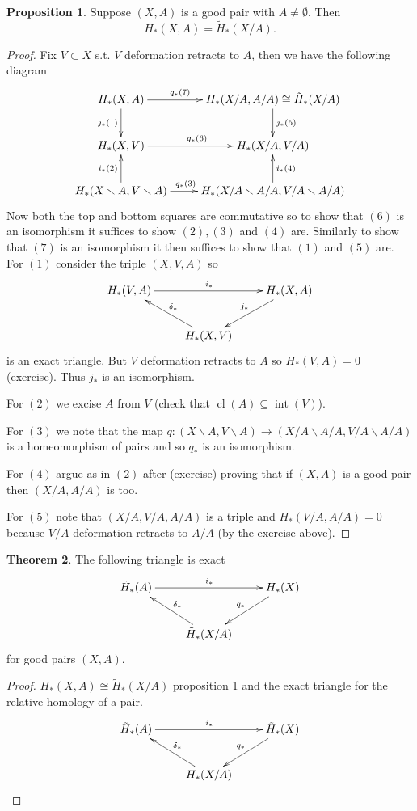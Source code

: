 \documentclass[12pt]{article}
\theoremstyle{definition}
\newtheorem{thm}{Theorem}[subsection]
\newtheorem{prop}[thm]{Proposition}
\theoremstyle{definition}
\renewcommand{\H}{H_*}
\begin{document}
\begin{prop}\label{pairiso}%
Suppose $(X,A)$ is a good pair with $A \ne \emptyset$.
Then 
\[
\H(X,A) = \tilde\H(X/A).
\]
\end{prop}
\begin{proof}
Fix $V \subset X$ s.t. $V$ deformation retracts to $A$, then we have the following diagram
\[
\xymatrix
{
\H(X,A)\ar[d]_{j_* (1)} \ar[r]^{q_* (7) \quad\qquad} & \H(X/A,A/A) \cong \tilde\H(X/A)\ar[d]^{j_* (5)}\\
\H(X,V) \ar[r]^{q_* (6)}  & \H(X/A,V/A)\\
\H(X\smallsetminus A,V\smallsetminus A)\ar[u]^{i_* (2)} \ar[r]^{q_* (3)\qquad}& \H(X/A\smallsetminus A/A,V/A\smallsetminus A/A)\ar[u]_{i_* (4)}
}
\]
Now both the top and bottom squares are commutative so to show that $(6)$ is an isomorphism it suffices to show $(2),(3)$ and $(4)$ are.
Similarly to show that $(7)$ is an isomorphism it then suffices to show that $(1)$ and $(5)$ are.
For $(1)$ consider the triple $(X,V,A)$ so
\[
\xymatrix
{
 \H(V,A) \ar[rr]^{i_*}& &\H(X,A)\ar[dl]_{j_*} \\
 &\H(X,V) \ar[ul]_{\delta_*}&
}
\]
is an exact triangle.
But $V$ deformation retracts to $A$ so $\H(V,A) = 0$ (exercise).
Thus $j_*$ is an isomorphism.

For $(2)$ we excise $A$ from $V$ (check that $\operatorname{cl}(A) \subseteq \operatorname{int}(V)$).

For $(3)$ we note that the map $q\colon (X\smallsetminus A, V\smallsetminus A) \to (X/A\smallsetminus A/A , V/A\smallsetminus A/A)$ is a homeomorphism of pairs and so $q_*$ is an isomorphism.

For $(4)$ argue as in $(2)$ after (exercise) proving that if $(X,A)$ is a good pair then $(X/A,A/A)$ is too.

For $(5)$ note that $(X/A,V/A,A/A)$ is a triple and $\H(V/A,A/A) = 0$ because $V/A$ deformation retracts to $A/A$ (by the exercise above).
\end{proof}

\begin{thm}
The following triangle is exact
\[
\xymatrix
{
 \tilde\H(A) \ar[rr]^{i_*}& &\tilde\H(X)\ar[dl]_{q_*} \\
 &\tilde\H(X/A) \ar[ul]_{\delta_*}&
}
\]
for good pairs $(X,A)$.
\end{thm}
\begin{proof}
$\H(X,A) \cong \tilde\H(X/A)$ proposition \ref{pairiso} and the exact triangle for the relative homology of a pair.
\[
\xymatrix
{
 \tilde\H(A) \ar[rr]^{i_*}& &\tilde\H(X)\ar[dl]_{q_*} \\
 &\H(X/A) \ar[ul]_{\delta_*}&
}
\]
\end{proof}
\end{document}
